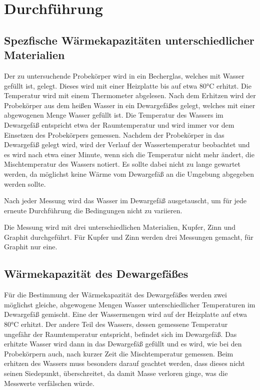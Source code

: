 \section{Durchführung}
\label{sec:Durchführung}


\subsection{Spezfische Wärmekapazitäten unterschiedlicher Materialien}

Der zu untersuchende Probekörper wird in ein Becherglas, welches mit Wasser gefüllt ist, gelegt. Dieses wird mit einer Heizplatte
bis auf etwa 80\si{\celsius} erhitzt. Die Temperatur wird mit einem Thermometer abgelesen. Nach dem Erhitzen wird der 
Probekörper aus dem heißen Wasser in ein Dewargefäßes gelegt, welches mit einer abgewogenen Menge Wasser gefüllt ist. Die Temperatur
des Wassers im Dewargefäß entspricht etwa der Raumtemperatur und wird immer vor dem Einsetzen des Probekörpers gemessen. Nachdem der
Probekörper in das Dewargefäß gelegt wird, wird der Verlauf der Wassertemperatur beobachtet und es wird nach etwa einer Minute,
wenn sich die Temperatur nicht mehr ändert, die
Mischtemperatur des Wassers notiert. Es sollte dabei nicht zu lange gewartet werden, da möglichst keine Wärme vom Dewargefäß an 
die Umgebung abgegeben werden sollte. 

Nach jeder Messung wird das Wasser im Dewargefäß ausgetauscht, um für jede erneute Durchführung die Bedingungen nicht zu variieren.

Die Messung wird mit drei unterschiedlichen Materialien, Kupfer, Zinn und Graphit durchgeführt. Für Kupfer und Zinn werden drei
Messungen gemacht, für Graphit nur eine.

\subsection{Wärmekapazität des Dewargefäßes}

Für die Bestimmung der Wärmekapazität des Dewargefäßes werden zwei möglichst gleiche, abgewogene Mengen Wasser unterschiedlicher
Temperaturen im Dewargefäß gemischt. Eine der Wassermengen wird auf der Heizplatte auf etwa 80\si{\celsius} erhitzt. Der andere
Teil des Wassers, dessen gemessene Temperatur ungefähr der Raumtemperatur entspricht, befindet sich im Dewargefäß. 
Das erhitzte Wasser wird dann in das Dewargefäß gefüllt und es wird, wie bei den Probekörpern auch, nach kurzer Zeit die 
Mischtemperatur gemessen. Beim erhitzen des Wassers muss besonders darauf geachtet werden, dass dieses nicht seinen Siedepunkt,
überschreitet, da damit Masse verloren ginge, was die Messwerte verfälschen würde.